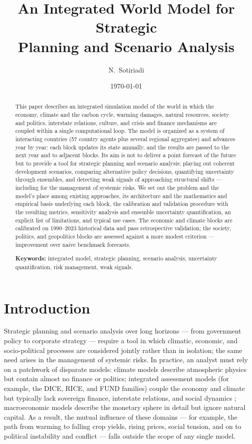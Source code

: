 \documentclass[11pt,a4paper]{article}
\title{\textbf{An Integrated World Model for Strategic\\Planning and Scenario Analysis}}
\author{N.~Sotiriadi}
\date{\today}
\begin{document}
\maketitle

\begin{abstract}
\noindent
This paper describes an integrated simulation model of the world in which the economy, climate
and the carbon cycle, warming damages, natural resources, society and politics, interstate
relations, culture, and crisis and finance mechanisms are coupled within a single computational
loop. The model is organized as a system of interacting countries (57 country agents plus several
regional aggregates) and advances year by year: each block updates its state annually, and the
results are passed to the next year and to adjacent blocks. Its aim is not to deliver a point
forecast of the future but to provide a tool for strategic planning and scenario analysis:
playing out coherent development scenarios, comparing alternative policy decisions, quantifying
uncertainty through ensembles, and detecting weak signals of approaching structural shifts ---
including for the management of systemic risks. We set out the problem and the model's place among
existing approaches, its architecture and the mathematics and empirical basis underlying each
block, the calibration and validation procedure with the resulting metrics, sensitivity analysis
and ensemble uncertainty quantification, an explicit list of limitations, and typical use cases.
The economic and climate blocks are calibrated on 1990--2023 historical data and pass
retrospective validation; the society, politics, and geopolitics blocks are assessed against a
more modest criterion --- improvement over naive benchmark forecasts.

\medskip
\noindent\textbf{Keywords:} integrated model, strategic planning, scenario analysis, uncertainty
quantification, risk management, weak signals.
\end{abstract}

\section{Introduction}

Strategic planning and scenario analysis over long horizons --- from government policy to
corporate strategy --- require a tool in which climatic, economic, and socio-political processes
are considered jointly rather than in isolation; the same need arises in the management of
systemic risks. In practice, an analyst must rely on a patchwork of disparate models: climate
models describe atmospheric physics but contain almost no finance or politics; integrated
assessment models (for example, the DICE, RICE, and FUND families) couple the economy and climate
but typically lack sovereign finance, interstate relations, and social dynamics \citep{nordhaus2017};
macroeconomic models describe the monetary sphere in detail but ignore natural capital. As a
result, the mutual influence of these domains --- for example, the path from warming to falling
crop yields, rising prices, social tension, and on to political instability and conflict --- falls
outside the scope of any single model.
\end{document}
